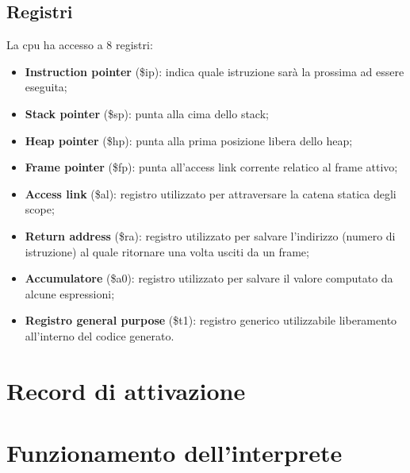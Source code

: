 \documentclass[../main.tex]{subfiles}
\begin{document}
\subsection{Registri}
La cpu ha accesso a 8 registri:
\begin{itemize}
    \item \textbf{Instruction pointer} (\$ip): indica quale istruzione sar\`a la prossima ad essere eseguita;
    \item \textbf{Stack pointer} (\$sp): punta alla cima dello stack;
    \item \textbf{Heap pointer} (\$hp): punta alla prima posizione libera dello heap;
    \item \textbf{Frame pointer} (\$fp): punta all'access link corrente relatico al frame attivo;
    \item \textbf{Access link} (\$al): registro utilizzato per attraversare la catena statica degli scope;
    \item \textbf{Return address} (\$ra): registro utilizzato per salvare l'indirizzo (numero di istruzione) al quale ritornare una volta usciti da un frame;
    \item \textbf{Accumulatore} (\$a0): registro utilizzato per salvare il valore computato da alcune espressioni;
    \item \textbf{Registro general purpose} (\$t1): registro generico utilizzabile liberamento all'interno del codice generato.
\end{itemize}

\section{Record di attivazione}\label{s:record-di-attivazione}

\section{Funzionamento dell'interprete}\label{s:funzionamento-interprete}
\end{document}

